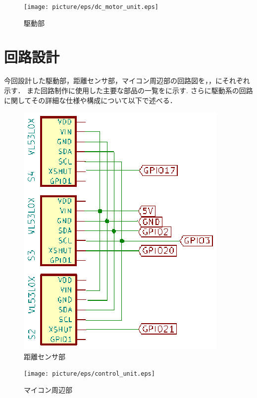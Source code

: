 \begin{figure}[h]
\centering
\texttt{[image: picture/eps/dc\_motor\_unit.eps]}
\caption{駆動部}
\label{fig::dc_motor_unit}
\end{figure}

\section{回路設計}
今回設計した駆動部，距離センサ部，マイコン周辺部の回路図を，，にそれぞれ示す．
また回路制作に使用した主要な部品の一覧をに示す.
さらに駆動系の回路に関してその詳細な仕様や構成について以下で述べる．

\begin{figure}[b]
\centering
\includegraphics[scale=1]{picture/eps/sensor_unit.eps}
\caption{距離センサ部}
\label{fig::sensor_unit}
\end{figure}

\begin{figure}[h]
\centering
\texttt{[image: picture/eps/control\_unit.eps]}
\caption{マイコン周辺部}
\label{fig::control_unit}
\end{figure}

\clearpage

